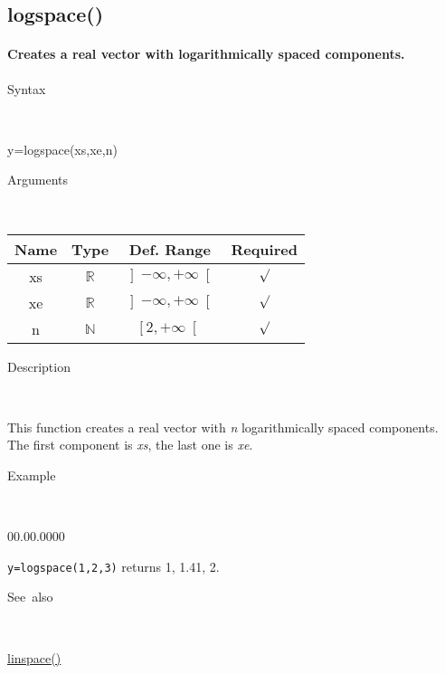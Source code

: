 \newpage
\subsection*{\hypertarget{logspace}{}{\Large logspace()}}


\paragraph{\textmd{\label{par:logspace}}Creates a real vector with logarithmically
spaced components.}

\begin{description}
\item [Syntax]~
\end{description}
y=logspace(xs,xe,n)

\begin{description}
\item [Arguments]~
\end{description}
\begin{tabular}{|c|c|c|c|}
\hline 
Name&
Type&
Def. Range&
Required\tabularnewline
\hline
\hline 
xs&
$\mathbb{R}$&
$\left]-\infty,+\infty\right[$&
$\surd$\tabularnewline
\hline
xe&
$\mathbb{R}$&
$\left]-\infty,+\infty\right[$&
$\surd$\tabularnewline
\hline
n&
$\mathbb{N}$&
$\left[2,+\infty\right[$&
$\surd$\tabularnewline
\hline
\end{tabular}

\begin{description}
\item [Description]~
\end{description}
This function creates a real vector with \textit{n} logarithmically
spaced components. The first component is \textit{xs}, the last one
is \textit{xe}.

\begin{description}
\item [Example]~
\end{description}
\begin{lyxlist}{00.00.0000}
\item [\texttt{y=logspace(1,2,3)}]returns 1, 1.41, 2.
\end{lyxlist}
\begin{description}
\item [See~also]~
\end{description}
\textcolor{blue}{\hyperlink{linspace}{linspace()}}


\newpage
{}



